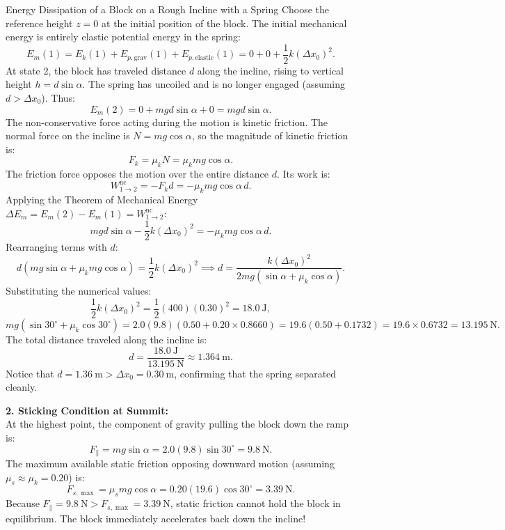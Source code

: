 \begin{workedexample}{Energy Dissipation of a Block on a Rough Incline with a Spring}
Choose the reference height $z = 0$ at the initial position of the block.
The initial mechanical energy is entirely elastic potential energy in the spring:
\[
E_m(1) = E_k(1) + E_{p,\text{grav}}(1) + E_{p,\text{elastic}}(1) = 0 + 0 + \frac{1}{2} k (\Delta x_0)^2.
\]
At state 2, the block has traveled distance $d$ along the incline, rising to vertical height $h = d\sin\alpha$. The spring has uncoiled and is no longer engaged (assuming $d > \Delta x_0$). Thus:
\[
E_m(2) = 0 + mg d\sin\alpha + 0 = mg d\sin\alpha.
\]
The non-conservative force acting during the motion is kinetic friction. The normal force on the incline is $N = mg\cos\alpha$, so the magnitude of kinetic friction is:
\[
F_k = \mu_k N = \mu_k mg\cos\alpha.
\]
The friction force opposes the motion over the entire distance $d$. Its work is:
\[
W_{1\to 2}^{\text{nc}} = -F_k d = -\mu_k mg\cos\alpha\, d.
\]
Applying the Theorem of Mechanical Energy $\Delta E_m = E_m(2) - E_m(1) = W_{1\to 2}^{\text{nc}}$:
\[
mg d\sin\alpha - \frac{1}{2} k (\Delta x_0)^2 = -\mu_k mg\cos\alpha\, d.
\]
Rearranging terms with $d$:
\[
d \left( mg\sin\alpha + \mu_k mg\cos\alpha \right) = \frac{1}{2} k (\Delta x_0)^2 \implies d = \frac{k (\Delta x_0)^2}{2mg(\sin\alpha + \mu_k \cos\alpha)}.
\]
Substituting the numerical values:
\[
\frac{1}{2} k (\Delta x_0)^2 = \frac{1}{2}(400)(0.30)^2 = 18.0\ \mathrm{J},
\]
\[
mg(\sin 30^\circ + \mu_k \cos 30^\circ) = 2.0(9.8)\left(0.50 + 0.20 \times 0.8660\right) = 19.6(0.50 + 0.1732) = 19.6 \times 0.6732 = 13.195\ \mathrm{N}.
\]
The total distance traveled along the incline is:
\[
d = \frac{18.0\ \mathrm{J}}{13.195\ \mathrm{N}} \approx 1.364\ \mathrm{m}.
\]
Notice that $d = 1.36\ \mathrm{m} > \Delta x_0 = 0.30\ \mathrm{m}$, confirming that the spring separated cleanly.

\textbf{2. Sticking Condition at Summit:}\\
At the highest point, the component of gravity pulling the block down the ramp is:
\[
F_{\parallel} = mg\sin\alpha = 2.0(9.8)\sin 30^\circ = 9.8\ \mathrm{N}.
\]
The maximum available static friction opposing downward motion (assuming $\mu_s \approx \mu_k = 0.20$) is:
\[
F_{s,\max} = \mu_s mg\cos\alpha = 0.20(19.6)\cos 30^\circ = 3.39\ \mathrm{N}.
\]
Because $F_{\parallel} = 9.8\ \mathrm{N} > F_{s,\max} = 3.39\ \mathrm{N}$, static friction cannot hold the block in equilibrium. The block immediately accelerates back down the incline!
\end{workedexample}

